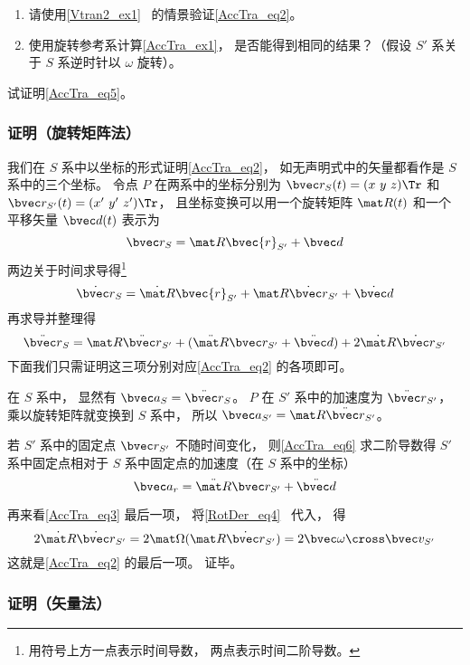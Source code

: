 \begin{exercise}{}\label{AccTra_exe1}
\begin{enumerate}
\item 请使用\autoref{Vtran2_ex1}~ 的情景验证\autoref{AccTra_eq2}。
\item 使用旋转参考系计算\autoref{AccTra_ex1}， 是否能得到相同的结果？（假设 $S'$ 系关于 $S$ 系逆时针以 $\omega$ 旋转）。
\end{enumerate}
\end{exercise}

\begin{exercise}{}
试证明\autoref{AccTra_eq5}。
\end{exercise}

\subsubsection{证明（旋转矩阵法）}
我们在 $S$ 系中以坐标的形式证明\autoref{AccTra_eq2}， 如无声明式中的矢量都看作是 $S$ 系中的三个坐标。 令点 $P$ 在两系中的坐标分别为 $\bvec r_S(t) = (x\ y\ z)\Tr$ 和 $\bvec r_{S'}(t) = (x'\ y'\ z')\Tr$， 且坐标变换可以用一个旋转矩阵 $\mat R(t)$ 和一个平移矢量 $\bvec d(t)$ 表示为
\begin{equation}\label{AccTra_eq6}
\bvec r_S = \mat R \bvec{r}_{S'} + \bvec d
\end{equation}
两边关于时间求导得\footnote{用符号上方一点表示时间导数， 两点表示时间二阶导数。}
\begin{equation}
\dot{\bvec r}_S = \dot{\mat R} \bvec{r}_{S'} + \mat R \dot{\bvec r}_{S'}+ \dot{\bvec d}
\end{equation}
再求导并整理得
\begin{equation}\label{AccTra_eq3}
\ddot{\bvec r}_S = \mat R \ddot{\bvec r}_{S'} + (\ddot{\mat R} \bvec r_{S'} + \ddot{\bvec d}) + 2 \dot{\mat R} \dot{\bvec r}_{S'}
\end{equation}
下面我们只需证明这三项分别对应\autoref{AccTra_eq2} 的各项即可。

在 $S$ 系中， 显然有 $\bvec a_S = \ddot{\bvec r}_S$。 $P$ 在 $S'$ 系中的加速度为 $\ddot{\bvec r}_{S'}$， 乘以旋转矩阵就变换到 $S$ 系中， 所以 $\bvec a_{S'} = \mat R \ddot{\bvec r}_{S'}$。

若 $S'$ 系中的固定点 $\bvec r_{S'}$ 不随时间变化， 则\autoref{AccTra_eq6} 求二阶导数得 $S'$ 系中固定点相对于 $S$ 系中固定点的加速度（在 $S$ 系中的坐标）
\begin{equation}
\bvec a_r = \ddot{\mat R} \bvec r_{S'} + \ddot{\bvec d}
\end{equation}

再来看\autoref{AccTra_eq3} 最后一项， 将\autoref{RotDer_eq4}~ 代入， 得
\begin{equation}
2\dot{\mat R} \dot{\bvec r}_{S'} = 2\mat\Omega (\mat R \dot{\bvec r}_{S'}) = 2\bvec \omega \cross \bvec v_{S'}
\end{equation}
这就是\autoref{AccTra_eq2} 的最后一项。 证毕。

\subsubsection{证明（矢量法）}
